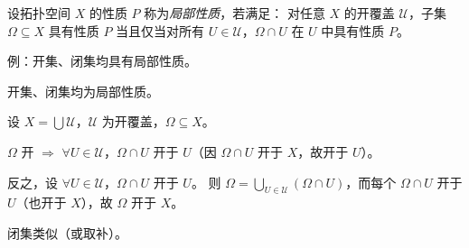 \documentclass[lang=cn,a4paper,newtx,figureplace=section,tableplace=section]{elegantbook}
\begin{document}
\begin{definition}[局部性质]\label{def:hereditary-property}
  设拓扑空间 $X$ 的性质 $P$ 称为\emph{局部性质}，若满足：
  对任意 $X$ 的开覆盖 $\mathcal U$，子集 $\Omega\subseteq X$ 具有性质 $P$ 当且仅当对所有 $U\in\mathcal U$，$\Omega\cap U$ 在 $U$ 中具有性质 $P$。

  例：开集、闭集均具有局部性质。
\end{definition}

\begin{example}\label{ex:open-closed-hereditary}
  开集、闭集均为局部性质。

  设 $X=\bigcup\mathcal U$，$\mathcal U$ 为开覆盖，$\Omega\subseteq X$。

  $\Omega$ 开 $\Rightarrow$ $\forall U\in\mathcal U$，$\Omega\cap U$ 开于 $U$（因 $\Omega\cap U$ 开于 $X$，故开于 $U$）。

  反之，设 $\forall U\in\mathcal U$，$\Omega\cap U$ 开于 $U$。
  则 $\Omega=\bigcup_{U\in\mathcal U}(\Omega\cap U)$，而每个 $\Omega\cap U$ 开于 $U$（也开于 $X$），故 $\Omega$ 开于 $X$。

  闭集类似（或取补）。
\end{example}
\end{document}
